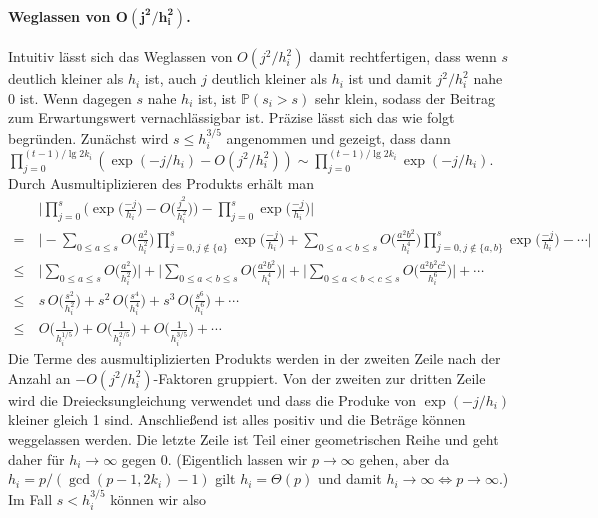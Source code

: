 \documentclass[a4paper, 10pt, ngerman]{article}
\renewcommand{\P}{\mathbb{P}}
\begin{document}
\paragraph{Weglassen von $\bm{O(j^2/h_i^2)}$.} Intuitiv lässt sich das Weglassen von $O(j^2/h_i^2)$ damit rechtfertigen, dass wenn $s$ deutlich kleiner als $h_i$ ist, auch $j$ deutlich kleiner als $h_i$ ist und damit $j^2/h_i^2$ nahe 0 ist. Wenn dagegen $s$ nahe $h_i$ ist, ist $\P(s_i > s)$ sehr klein, sodass der Beitrag zum Erwartungswert vernachlässigbar ist. Präzise lässt sich das wie folgt begründen. Zunächst wird $s \le h_{i}^{3/5}$ angenommen und gezeigt, dass dann $\prod_{j = 0}^{(t-1) / \lg 2k_i} (\exp (-j/h_i) - O (j^2/h_i^2)) \sim \prod_{j = 0}^{(t-1) / \lg 2k_i} \exp (-j/h_i)$. Durch Ausmultiplizieren des Produkts erhält man
\begin{align*}
        & \ \Bigg \vert
    \prod_{j = 0}^{s} \Bigg ( \exp \bigg ( \frac {-j}{h_i} \bigg )
    - O \bigg ( \frac {j^2} {h_i^2} \bigg ) \Bigg )
    - \prod_{j = 0}^{s} \exp \bigg ( \frac {-j}{h_i} \bigg )
    \Bigg \vert          \\
    =   & \ \Bigg \vert
    - \sum_{0 \le a \le s} O \bigg ( \frac {a^2} {h_i^2} \bigg )
    \prod_{j = 0, j \notin \{a\}}^{s} \exp \bigg ( \frac {-j}{h_i} \bigg )
    + \sum_{0 \le a < b \le s} O \bigg ( \frac {a^2b^2} {h_i^4} \bigg )
    \prod_{j = 0, j \notin \{a, b\}}^{s}
    \exp \bigg ( \frac {-j}{h_i} \bigg ) - \cdots
    \Bigg \vert          \\
    \le & \ \Bigg \vert
    \sum_{0 \le a \le s} O \bigg ( \frac {a^2} {h_i^2} \bigg )
    \Bigg \vert + \Bigg \vert
    \sum_{0 \le a < b \le s} O \bigg ( \frac {a^2b^2} {h_i^4} \bigg )
    \Bigg \vert + \Bigg \vert
    \sum_{0 \le a < b < c \le s} O \bigg ( \frac {a^2b^2c^2} {h_i^6} \bigg )
    \Bigg \vert + \cdots \\
    \le & \
    s \, O \bigg ( \frac {s^2} {h_i^2} \bigg )
    +s^2 \, O \bigg ( \frac {s^4} {h_i^4} \bigg )
    +     s^3 \,  O \bigg ( \frac {s^6} {h_i^6} \bigg )
    + \cdots             \\
    \le & \
    O \bigg ( \frac 1 {h_i^{1/5}} \bigg )
    + O \bigg ( \frac 1 {h_i^{2/5}} \bigg )
    + O \bigg ( \frac 1 {h_i^{3/5}} \bigg )
    + \cdots
\end{align*}
Die Terme des ausmultiplizierten Produkts werden in der zweiten Zeile nach der Anzahl an $-O(j^2/h_i^2)$-Faktoren gruppiert. Von der zweiten zur dritten Zeile wird die Dreiecksungleichung verwendet und dass die Produke von $\exp(-j/h_i)$ kleiner gleich 1 sind. Anschließend ist alles positiv und die Beträge können weggelassen werden. Die letzte Zeile ist Teil einer geometrischen Reihe und geht daher für $h_i \to \infty$ gegen 0. (Eigentlich lassen wir $p \to \infty$ gehen, aber da $h_i = p/(\gcd(p - 1, 2k_i) - 1)$ gilt $h_i = \Theta(p)$ und damit $h_i \to \infty \Longleftrightarrow p \to \infty$.) Im Fall $s < h_i^{3/5}$ können wir also
\end{document}
